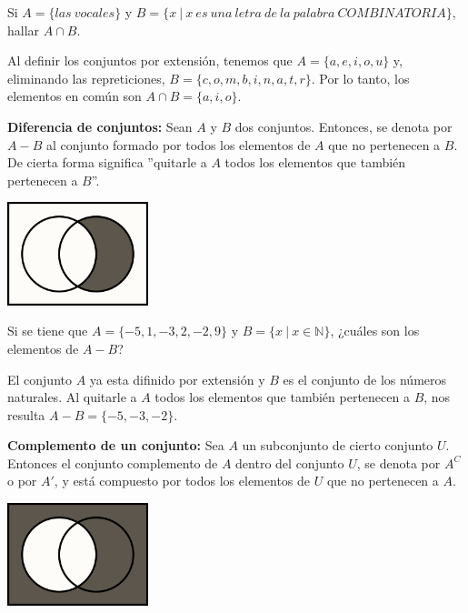\documentclass[12pt]{article}
\begin{document}
\begin{ejemplo}
    Si $A=\{las \ vocales\}$ y $B=\{x \ | \ x \ es \ una \ letra \ de \ la \ palabra \ COMBINATORIA\}$, hallar $A \cap B$.
\end{ejemplo}

\begin{solucion}
    Al definir los conjuntos por extensión, tenemos que $A=\{a,e,i,o,u\}$ y, eliminando las repreticiones, $B=\{c,o,m,b,i,n,a,t,r\}$.  Por lo tanto, los elementos en común son $A \cap B=\{a,i,o\}$.
\end{solucion}

\textbf{Diferencia de conjuntos:} Sean $A$ y $B$ dos conjuntos. Entonces, se denota por $A-B$ al conjunto formado por todos los elementos de $A$ que no pertenecen a $B$. De cierta forma significa ''quitarle a $A$ todos los elementos que también pertenecen a $B$''.

\begin{center}
    \includegraphics[height=3cm]{Imagenes/IMG1/Diferencia.png}
\end{center}

\begin{ejemplo}
    Si se tiene que $A=\{-5,1,-3,2,-2,9\}$ y $B=\{x \ | \ x \in \mathbb{N} \}$, ¿cuáles son los elementos de $A-B$?
\end{ejemplo}

\begin{solucion}
    El conjunto $A$ ya esta difinido por extensión y $B$ es el conjunto de los números naturales.  Al quitarle a $A$ todos los elementos que también pertenecen a $B$, nos resulta $A-B=\{-5,-3,-2\}$.
\end{solucion}

\textbf{Complemento de un conjunto:} Sea $A$ un subconjunto de cierto conjunto $U$. Entonces el conjunto complemento de $A$ dentro del conjunto $U$, se denota por $A^C$ o por $A'$, y está compuesto por todos los elementos de $U$ que no pertenecen a $A$.

\begin{center}
    \includegraphics[height=3cm]{Imagenes/IMG1/Complemento.png}
\end{center}
\end{document}
